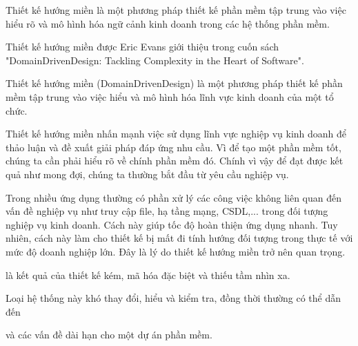 Thiết kế hướng miền là một phương pháp thiết kế phần mềm tập trung vào việc hiểu rõ và mô hình hóa ngữ cảnh kinh doanh trong các hệ thống phần mềm.

Thiết kế hướng miền được Eric Evans giới thiệu trong cuốn sách "DomainDrivenDesign: Tackling Complexity in the Heart of Software".

Thiết kế hướng miền (DomainDrivenDesign) là một phương pháp thiết kế phần mềm tập trung vào việc hiểu và mô hình hóa  lĩnh vực kinh doanh của một tổ chức.

Thiết kế hướng miền nhấn mạnh việc sử dụng lĩnh vực nghiệp vụ kinh doanh để thảo luận và đề xuất giải pháp đáp ứng nhu cầu. Vì để tạo một phần mềm tốt, chúng ta cần phải hiểu rõ về chính phần mềm đó. Chính vì vậy để đạt được kết quả như mong đợi, chúng ta thường bắt đầu từ yêu cầu nghiệp vụ.

Trong nhiều ứng dụng thường có phần xử lý các công việc không liên quan đến vấn đề nghiệp vụ như truy cập file, hạ tầng mạng, CSDL,... trong đối tượng nghiệp vụ kinh doanh. Cách này giúp tốc độ hoàn thiện ứng dụng nhanh. Tuy nhiên, cách này làm cho thiết kế bị mất đi tính hướng đối tượng trong thực tế với mức độ doanh nghiệp lớn. Đây là lý do thiết kế hướng miền trở nên quan trọng.







là kết quả của thiết kế kém, mã hóa đặc biệt và thiếu tầm nhìn xa.

Loại hệ thống này khó thay đổi, hiểu và kiểm tra, đồng thời thường có thể dẫn đến


và các vấn đề dài hạn cho một dự án phần mềm.

